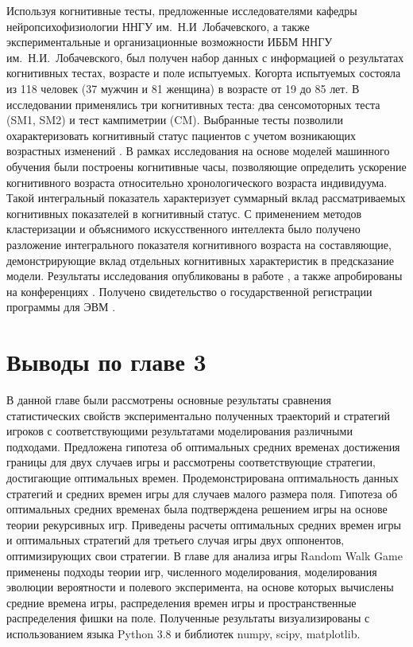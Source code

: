 Используя когнитивные тесты, предложенные исследователями кафедры нейропсихофизиологии ННГУ им.~Н.И~Лобачевского, а также экспериментальные и организационные возможности ИББМ ННГУ им.~Н.И.~Лобачевского, был получен набор данных с информацией о результатах когнитивных тестах, возрасте и поле испытуемых. Когорта испытуемых состояла из 118 человек (37 мужчин и 81 женщина) в возрасте от 19 до 85 лет. В исследовании применялись три когнитивных теста: два сенсомоторных теста (SM1, SM2) и тест кампиметрии (CM). Выбранные тесты позволили охарактеризовать когнитивный статус пациентов с учетом возникающих возрастных изменений \cite{10.17691/stm2019.11.1.13}. В рамках исследования на основе моделей машинного обучения были построены когнитивные часы, позволяющие определить ускорение когнитивного возраста относительно хронологического возраста индивидуума. Такой интегральный показатель характеризует суммарный вклад рассматриваемых когнитивных показателей в когнитивный статус. С применением методов кластеризации и объяснимого искусственного интеллекта было получено разложение интегрального показателя когнитивного возраста на составляющие, демонстрирующие вклад отдельных когнитивных характеристик в предсказание модели. Результаты исследования опубликованы в работе \cite{bib4}, а также апробированы на конференциях \cite{confbib2,confbib3}. Получено свидетельство о государственной регистрации программы для ЭВМ \cite{progbib2}.


\section{Выводы по главе 3}\label{sec:ch3/sec6}

В данной главе были рассмотрены основные результаты сравнения статистических свойств экспериментально полученных траекторий и стратегий игроков с соответствующими результатами моделирования различными подходами. Предложена гипотеза об оптимальных средних временах достижения границы для двух случаев игры и рассмотрены соответствующие стратегии, достигающие оптимальных времен. Продемонстрирована оптимальность данных стратегий и средних времен игры для случаев малого размера поля. Гипотеза об оптимальных средних временах была подтверждена решением игры на основе теории рекурсивных игр. Приведены расчеты оптимальных средних времен игры и оптимальных стратегий для третьего случая игры двух оппонентов, оптимизирующих свои стратегии. В главе для анализа игры Random Walk Game применены подходы теории игр, численного моделирования, моделирования эволюции вероятности и полевого эксперимента, на основе которых вычислены средние времена игры, распределения времен игры и пространственные распределения фишки на поле. Полученные результаты визуализированы с использованием языка Python 3.8 и библиотек numpy, scipy, matplotlib. 